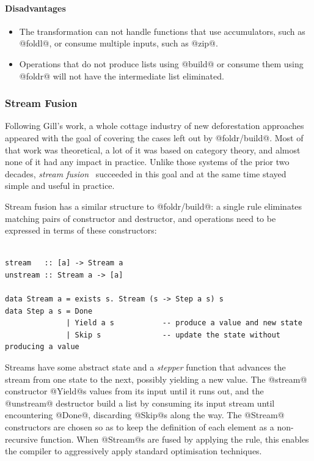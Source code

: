 \paragraph{Disadvantages}
\begin{itemize}
    \item The transformation can not handle functions that use accumulators,
        such as @foldl@, or consume multiple inputs, such as @zip@.

    \item Operations that do not produce lists using @build@ or consume them
        using @foldr@ will not have the intermediate list eliminated.
\end{itemize}


\subsubsection{Stream Fusion}

Following Gill's work, a whole cottage industry of new deforestation approaches
appeared with the goal of covering the cases left out by
@foldr/build@. Most of that work was
theoretical, a lot of it was based on category theory, and almost none of it had
any impact in practice. Unlike those systems of the prior two decades,
\emph{stream fusion}~\cite{Coutts:2007kp} succeeded in this
goal and at the same time stayed simple and useful in practice.

Stream fusion has a similar structure to @foldr/build@: a single rule
eliminates matching pairs of constructor and destructor, and operations need to
be expressed in terms of these constructors:
%
\begin{lstlisting}[style=Haskell,numbers=none,mathescape,caption={The \emph{stream fusion} transformation}]
%\bf$\langle$ stream fusion $\rangle$% forall s. stream (unstream s) $\mapsto$ s

stream   :: [a] -> Stream a
unstream :: Stream a -> [a]

data Stream a = exists s. Stream (s -> Step a s) s
data Step a s = Done
              | Yield a s           -- produce a value and new state
              | Skip s              -- update the state without producing a value
\end{lstlisting}

Streams have some abstract state and a \emph{stepper} function that advances the
stream from one state to the next, possibly yielding a new value. The
@stream@ constructor @Yield@s values from its input until it runs
out, and the @unstream@ destructor build a list by consuming its input
stream until encountering @Done@, discarding @Skip@s along the
way. The @Stream@ constructors are chosen so as to keep the definition of
each element as a non-recursive function. When @Stream@s are fused by
applying the rule, this enables the compiler to aggressively apply standard
optimisation techniques.

